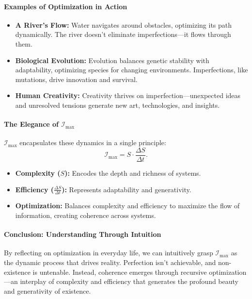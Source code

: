 \documentclass[12pt]{article}
\begin{document}
\paragraph{Examples of Optimization in Action}
\begin{itemize}
    \item \textbf{A River’s Flow:}  
    Water navigates around obstacles, optimizing its path dynamically. The river doesn’t eliminate imperfections—it flows through them.
    \item \textbf{Biological Evolution:}  
    Evolution balances genetic stability with adaptability, optimizing species for changing environments. Imperfections, like mutations, drive innovation and survival.
    \item \textbf{Human Creativity:}  
    Creativity thrives on imperfection—unexpected ideas and unresolved tensions generate new art, technologies, and insights.
\end{itemize}

\paragraph{The Elegance of \(\mathcal{I}_{\text{max}}\)}
\(\mathcal{I}_{\text{max}}\) encapsulates these dynamics in a single principle:
\[
\mathcal{I}_{\text{max}} = S \cdot \frac{\Delta S}{\Delta t}.
\]
\begin{itemize}
    \item \textbf{Complexity (\(S\)):}  
    Encodes the depth and richness of systems.
    \item \textbf{Efficiency (\(\frac{\Delta S}{\Delta t}\)):}  
    Represents adaptability and generativity.
    \item \textbf{Optimization:}  
    Balances complexity and efficiency to maximize the flow of information, creating coherence across systems.
\end{itemize}

\paragraph{Conclusion: Understanding Through Intuition}
By reflecting on optimization in everyday life, we can intuitively grasp \( \mathcal{I}_{\text{max}} \) as the dynamic process that drives reality. Perfection isn’t achievable, and non-existence is untenable. Instead, coherence emerges through recursive optimization—an interplay of complexity and efficiency that generates the profound beauty and generativity of existence.
\end{document}
